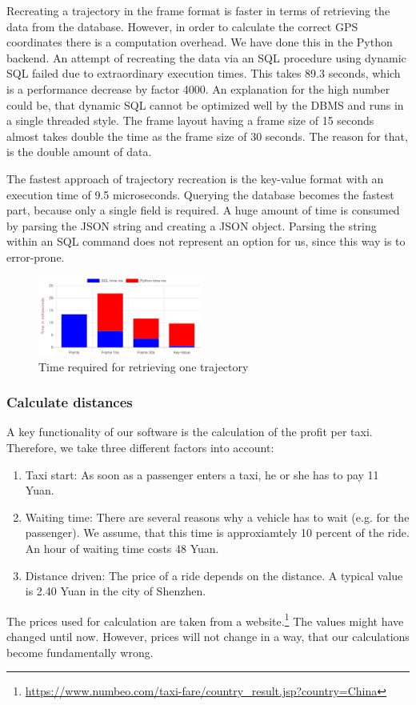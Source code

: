 \documentclass[10pt]{sig-alternate}
\begin{document}
Recreating a trajectory in the frame format is faster in terms of retrieving the data from the database. However, in order to calculate the correct GPS coordinates there is a computation overhead. We have done this in the Python backend. An attempt of recreating the data via an SQL procedure using dynamic SQL failed due to extraordinary execution times. This takes 89.3 seconds, which is a performance decrease by factor 4000. An explanation for the high number could be, that dynamic SQL cannot be optimized well by the DBMS and runs in a single threaded style. The frame layout having a frame size of 15 seconds almost takes double the time as the frame size of 30 seconds. The reason for that, is the double amount of data.

The fastest approach of trajectory recreation is the key-value format with an execution time of 9.5 microseconds. Querying the database becomes the fastest part, because only a single field is required. A huge amount of time is consumed by parsing the JSON string and creating a JSON object. Parsing the string within an SQL command does not represent an option for us, since this way is to error-prone.

\begin{figure}[ht]
\centering
\includegraphics[width=0.48\textwidth]{img/bench_whole_trajectory.png}
\caption{Time required for retrieving one trajectory}
\label{fig:bench_whole_trajectory}
\end{figure}


\subsubsection{Calculate distances}
A key functionality of our software is the calculation of the profit per taxi. Therefore, we take three different factors into account:
\begin{enumerate}
    \item Taxi start: As soon as a passenger enters a taxi, he or she has to pay 11 Yuan.
    \item Waiting time: There are several reasons why a vehicle has to wait (e.g. for the passenger). We assume, that this time is approxiamtely 10 percent of the ride. An hour of waiting time costs 48 Yuan.
    \item Distance driven: The price of a ride depends on the distance. A typical value is 2.40 Yuan in the city of Shenzhen.
\end{enumerate}
The prices used for calculation are taken from a website.\footnote{\href{https://www.numbeo.com/taxi-fare/country\_result.jsp?country=China}{https://www.numbeo.com/taxi-fare/country\_result.jsp?country=China}} The values might have changed until now. However, prices will not change in a way, that our calculations become fundamentally wrong.
\end{document}
